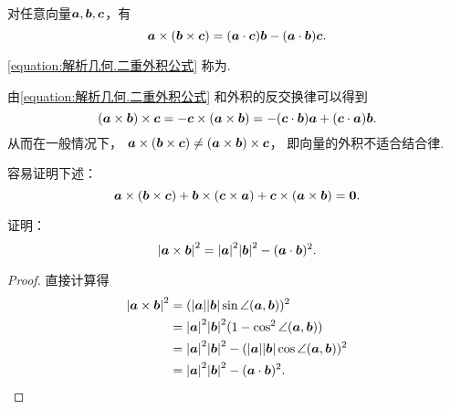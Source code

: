 \begin{theorem}
对任意向量\(\boldsymbol{a},\boldsymbol{b},\boldsymbol{c}\)，有
\begin{equation}\label{equation:解析几何.二重外积公式}
	\boldsymbol{a}\times(\boldsymbol{b}\times\boldsymbol{c})
	= (\boldsymbol{a}\cdot\boldsymbol{c}) \boldsymbol{b}
	- (\boldsymbol{a}\cdot\boldsymbol{b}) \boldsymbol{c}.
\end{equation}
\end{theorem}
\cref{equation:解析几何.二重外积公式}
称为.

由\cref{equation:解析几何.二重外积公式}
和外积的反交换律可以得到\begin{equation*}
	(\boldsymbol{a}\times\boldsymbol{b})\times\boldsymbol{c}
	= -\boldsymbol{c}\times(\boldsymbol{a}\times\boldsymbol{b})
	= -(\boldsymbol{c}\cdot\boldsymbol{b}) \boldsymbol{a}
	+ (\boldsymbol{c}\cdot\boldsymbol{a}) \boldsymbol{b}.
\end{equation*}
从而在一般情况下，
\(\boldsymbol{a}\times(\boldsymbol{b}\times\boldsymbol{c})
\neq
(\boldsymbol{a}\times\boldsymbol{b})\times\boldsymbol{c}\)，
即向量的外积不适合结合律.

容易证明下述：
\begin{equation}\label{equation:解析几何.雅克比等式}
	\boldsymbol{a}\times(\boldsymbol{b}\times\boldsymbol{c})
	+ \boldsymbol{b}\times(\boldsymbol{c}\times\boldsymbol{a})
	+ \boldsymbol{c}\times(\boldsymbol{a}\times\boldsymbol{b})
	= \boldsymbol{0}.
\end{equation}

\begin{example}
证明：\begin{equation*}
	\abs{\boldsymbol{a}\times\boldsymbol{b}}^2
	= \abs{\boldsymbol{a}}^2 \abs{\boldsymbol{b}}^2 - (\boldsymbol{a}\cdot\boldsymbol{b})^2.
\end{equation*}
\begin{proof}
\def\t{\angle(\vb{a},\vb{b})}%
直接计算得\begin{align*}
	\abs{\VectorOuterProduct{\vb{a}}{\vb{b}}}^2
	&= (\abs{\vb{a}}\abs{\vb{b}}\sin\t)^2 \\
	&= \abs{\vb{a}}^2 \abs{\vb{b}}^2 (1-\cos^2\t) \\
	&= \abs{\vb{a}}^2 \abs{\vb{b}}^2
	- (\abs{\vb{a}}\abs{\vb{b}}\cos\t)^2 \\
	&= \abs{\vb{a}}^2 \abs{\vb{b}}^2
	- (\VectorInnerProductDot{\vb{a}}{\vb{b}})^2.
	\qedhere
\end{align*}
\end{proof}
\end{example}

